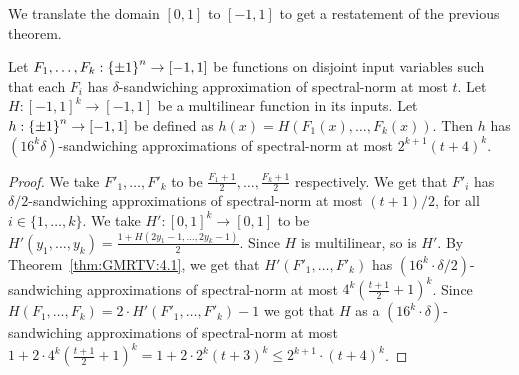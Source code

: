 We translate the domain $[0,1]$ to $[-1,1]$ to get  a restatement of the previous theorem.
\begin{theorem}\label{thm:GMRTV:4.1-new-version}
 	Let $F_1, \ldots, F_k : {\{\pm1\}}^n \to [-1,1]$ be functions on disjoint input variables such that each $F_i$ has $\delta$-sandwiching approximation of spectral-norm at most $t$.
 	Let $H:[-1,1]^k \to [-1,1]$ be a multilinear function in its inputs.
 	Let $h: {\{\pm1\}}^n \to [-1,1]$ be defined as $h(x) = H(F_1(x), \ldots, F_k(x))$. Then $h$ has $(16^k\delta)$-sandwiching approximations of spectral-norm at most $2^{k+1}(t+4)^k$.
\end{theorem}
\begin{proof} We take $F'_1, \ldots, F'_k$ to be $\frac{F_1+1}{2}, \ldots, \frac{F_{k}+1}{2}$ respectively.
We get that $F'_i$ has $\delta/2$-sandwiching approximations of spectral-norm at most $(t+1)/2$, for all $i\in \{1,\ldots, k\}$.
We take $H':[0,1]^k\to [0,1]$ to be 
$H'(y_1, \ldots, y_k) = \frac{1+H(2y_1 - 1, \ldots, 2y_k-1)}{2}$.
Since $H$ is multilinear, so is $H'$.
By Theorem~\ref{thm:GMRTV:4.1}, we get that $H'(F'_1, \ldots, F'_k)$ 
has $(16^{k} \cdot \delta/2)$-sandwiching approximations of spectral-norm at most $4^k(\frac{t+1}{2}+1)^k$.
Since $H(F_1, \ldots, F_k) = 2\cdot H'(F'_1, \ldots, F'_k) - 1$
we got that $H$ as a $(16^{k} \cdot \delta)$-sandwiching approximations of spectral-norm at most $1+2\cdot4^k(\frac{t+1}{2}+1)^k = 1+2\cdot 2^{k}(t+3)^k \le 2^{k+1} \cdot (t+4)^k$.
\end{proof} 
	
